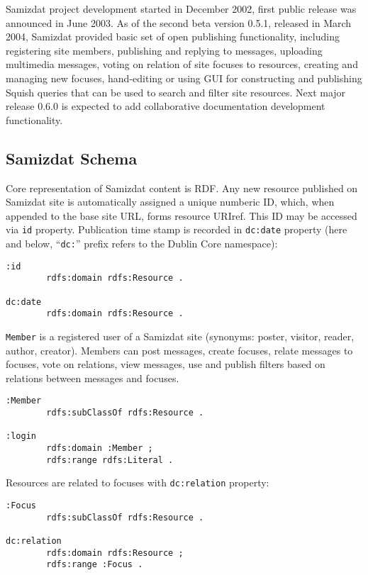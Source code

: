 \documentclass{llncs}
\begin{document}
Samizdat project development started in December 2002, first public release
was announced in June 2003. As of the second beta version 0.5.1, released in
March 2004, Samizdat provided basic set of open publishing functionality,
including registering site members, publishing and replying to messages,
uploading multimedia messages, voting on relation of site focuses to
resources, creating and managing new focuses, hand-editing or using GUI for
constructing and publishing Squish queries that can be used to search and
filter site resources. Next major release 0.6.0 is expected to add
collaborative documentation development functionality.

\subsection{Samizdat Schema}

Core representation of Samizdat content is RDF. Any new resource published on
Samizdat site is automatically assigned a unique numberic ID, which, when
appended to the base site URL, forms resource URIref. This ID may be accessed
via {\tt id} property. Publication time stamp is recorded in {\tt dc:date}
property (here and below, ``{\tt dc:}'' prefix refers to the Dublin Core
namespace):

\begin{verbatim}
:id
        rdfs:domain rdfs:Resource .

dc:date
        rdfs:domain rdfs:Resource .
\end{verbatim}

{\tt Member} is a registered user of a Samizdat site (synonyms: poster,
visitor, reader, author, creator). Members can post messages, create focuses,
relate messages to focuses, vote on relations, view messages, use and publish
filters based on relations between messages and focuses.

\begin{verbatim}
:Member
        rdfs:subClassOf rdfs:Resource .

:login
        rdfs:domain :Member ;
        rdfs:range rdfs:Literal .
\end{verbatim}

Resources are related to focuses with {\tt dc:relation} property:

\begin{verbatim}
:Focus
        rdfs:subClassOf rdfs:Resource .

dc:relation
        rdfs:domain rdfs:Resource ;
        rdfs:range :Focus .
\end{verbatim}
\end{document}
